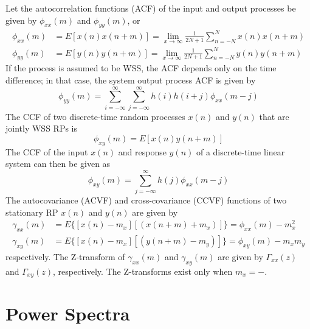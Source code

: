 \documentclass[11pt]{book}
\theoremstyle{example}
\begin{document}
Let the autocorrelation functions (ACF) of the input and output processes be given by $\phi_{xx}(m)$ and $\phi_{yy}(m)$, or
\begin{align}
	\phi_{xx}(m)&=E[x(n)x(n+m)]=\lim_{x\to\infty}{\frac{1}{2N+1}\sum_{n=-N}^N{x(n)x(n+m)}}\\
	\phi_{yy}(m)&=E[y(n)y(n+m)]=\lim_{x\to\infty}{\frac{1}{2N+1}\sum_{n=-N}^N{y(n)y(n+m)}}
\end{align}
If the process is assumed to be WSS, the ACF depends only on the time difference; in that case, the system output process ACF is given by
\begin{equation}
	\phi_{yy}(m)=\sum_{i=-\infty}^\infty\sum_{j=-\infty}^\infty{h(i)h(i+j)\phi_{xx}(m-j)}
\end{equation}
The CCF of two discrete-time random processes $x(n)$ and $y(n)$ that are jointly WSS RPs is
\begin{equation}
	\phi_{xy}(m)=E[x(n)y(n+m)]
\end{equation}
The CCF of the input $x(n)$ and response $y(n)$ of a discrete-time linear system can then be given as
\begin{equation}
	\phi_{xy}(m)=\sum_{j=-\infty}^\infty{h(j)\phi_{xx}(m-j)}
\end{equation}
The autocovariance (ACVF) and cross-covariance (CCVF) functions of two stationary RP $x(n)$ and $y(n)$ are given by
\begin{align}
	\gamma_{xx}(m)&=E\{[x(n)-m_x][(x(n+m)+m_x)]\}=\phi_{xx}(m)-m^2_x\\
	\gamma_{xy}(m)&=E\{[x(n)-m_x][(y(n+m)-m_y)]\}=\phi_{xy}(m)-m_xm_y
\end{align}
respectively. The Z-transform of $\gamma_{xx}(m)$ and $\gamma_{xy}(m)$ are given by $\Gamma_{xx}(z)$ and $\Gamma_{xy}(z)$, respectively. The Z-transforms exist only when $m_x=-$.

\section{Power Spectra}
\end{document}
